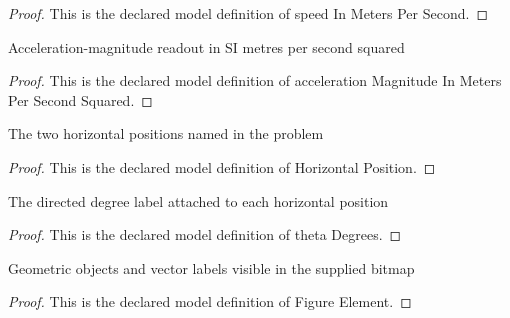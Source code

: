 \begin{proof}
  This is the declared model definition of speed In Meters Per Second.
\end{proof}
\begin{definition}
  \label{def:physics:phyx-mini-0692:phyxminiproblems-problemphyxmini0692-accelerationmagnitudeinmeterspersecondsquared}
  Acceleration-magnitude readout in SI metres per second squared
\end{definition}
\begin{proof}
  This is the declared model definition of acceleration Magnitude In Meters Per Second Squared.
\end{proof}
\begin{definition}
  \label{def:physics:phyx-mini-0692:phyxminiproblems-problemphyxmini0692-horizontalposition}
  The two horizontal positions named in the problem
\end{definition}
\begin{proof}
  This is the declared model definition of Horizontal Position.
\end{proof}
\begin{definition}
  \label{def:physics:phyx-mini-0692:phyxminiproblems-problemphyxmini0692-horizontalposition-thetadegrees}
  The directed degree label attached to each horizontal position
\end{definition}
\begin{proof}
  This is the declared model definition of theta Degrees.
\end{proof}
\begin{definition}
  \label{def:physics:phyx-mini-0692:phyxminiproblems-problemphyxmini0692-figureelement}
  Geometric objects and vector labels visible in the supplied bitmap
\end{definition}
\begin{proof}
  This is the declared model definition of Figure Element.
\end{proof}
